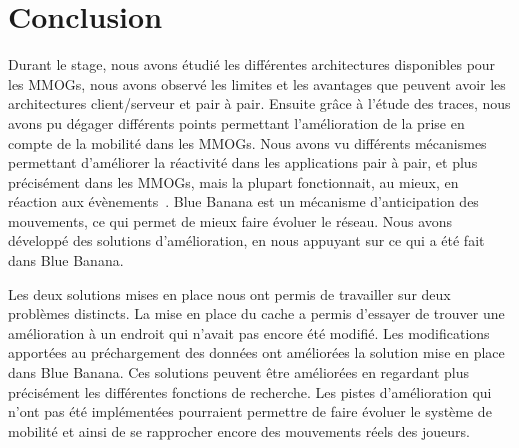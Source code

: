 \section{Conclusion}
	Durant le stage, nous avons étudié les différentes architectures disponibles pour les MMOGs, nous avons observé les limites et les avantages que peuvent avoir les architectures client/serveur et pair à pair. Ensuite grâce à l'étude des traces, nous avons pu dégager différents points permettant l'amélioration de la prise en compte de la mobilité dans les MMOGs. Nous avons vu différents mécanismes permettant d'améliorer la réactivité dans les applications pair à pair, et plus précisément dans les MMOGs, mais la plupart fonctionnait, au mieux, en réaction aux évènements~\cite{10.1109/SRDS.2006.33}. Blue Banana est un mécanisme d'anticipation des mouvements, ce qui permet de mieux faire évoluer le réseau. Nous avons développé des solutions d'amélioration, en nous appuyant sur ce qui a été fait dans Blue Banana.\\

	\par Les deux solutions mises en place nous ont permis de travailler sur deux problèmes distincts. La mise en place du cache a permis d'essayer de trouver une amélioration à un endroit qui n'avait pas encore été modifié. Les modifications apportées au préchargement des données ont améliorées la solution mise en place dans Blue Banana. Ces solutions peuvent être améliorées en regardant plus précisément les différentes fonctions de recherche. Les pistes d'amélioration qui n'ont pas été implémentées pourraient permettre de faire évoluer le système de mobilité et ainsi de se rapprocher encore des mouvements réels des joueurs. 	
